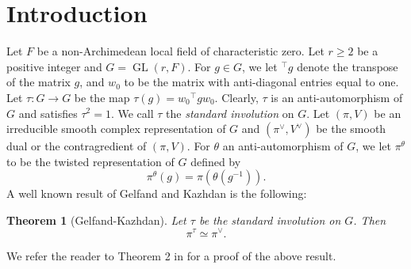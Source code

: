 \documentclass[11pt, a4paper, reqno]{amsart}
\newtheorem{theorem}{Theorem}[section]
\theoremstyle{definition}
\theoremstyle{remark}
\theoremstyle{example}
\theoremstyle{note}
\numberwithin{equation}{section}
\DeclareMathOperator{\GL}{GL}
\begin{document}
\begin{abstract}
Let $F$ be a non-Archimedean local field of characteristic zero and $G=\GL(r,F).$ Let $r,n \geq 2$ and $\widetilde{G}$ be an $n$-fold Kazhdan-Patterson cover of $G$. Let $\pi$ be an irreducible smooth representation of $G$ and $\pi^{\vee}$ be the contragredient of $\pi$. Let $\tau$ be an involutive anti-automorphism of $G$ satisfying $\pi^{\tau}\simeq \pi^{\vee}$. In this case, we say that $\tau$ is a dualizing or duality involution. When $r=2$, it is known that any lift of the standard involution on $G$ to $\widetilde{G}$ is a dualizing involution if and only if $n=2$. In  this paper, we study the dualizing property of the lifts of the standard involution on $G$ to $\widetilde{G}$ and prove the following: (i) When $r \geq 2$ and $n \geq 3$,  we show that any lift of the standard involution to $\widetilde{G}$ is never a dualizing involution. (ii) When $r=2t$ and $n=2$, we show that any lift of the standard involution to $\widetilde{G}$ is a dualizing  involution. (iii) When $r=2t+1$ and $n=2$, we show that there is a unique lift of the standard involution to $\widetilde{G}$ which is a dualizing involution. 
\end{abstract}



\section{Introduction}

Let $F$ be a non-Archimedean local field of characteristic zero. Let $r\geq 2$ be a positive integer and $G=\GL(r,F)$. For $g\in G$, we let $^{\top}g$ denote the transpose of the matrix $g$, and $w_{0}$ to be the matrix with anti-diagonal entries equal to one. Let $\tau: G\rightarrow G$ be the map $\tau(g)=w_{0} {}^{\top}gw_{0}$. Clearly, $\tau$ is an anti-automorphism of $G$ and satisfies $\tau^{2}=1$. We call $\tau$ the \textit{standard involution} on $G$. Let $(\pi,V)$ be an irreducible smooth complex representation of $G$ and $(\pi^{\vee}, V^{\vee})$ be the smooth dual or the contragredient of $(\pi,V)$. For $\theta$ an anti-automorphism of $G$, we let $\pi^{\theta}$ to be the twisted representation of $G$ defined by \[\pi^{\theta}(g)=\pi(\theta(g^{-1})).\]
A well known result of Gelfand and Kazhdan is the following: 

\begin{theorem}[Gelfand-Kazhdan] Let $\tau$ be the standard involution on $G$. Then \[\pi^{\tau}\simeq \pi^{\vee}.\]
\end{theorem}
We refer the reader to Theorem 2 in \cite{GelKaj} for a proof of the above result. \\
\end{document}
